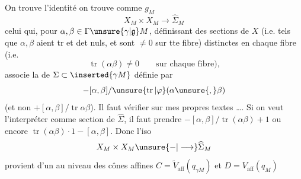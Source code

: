 On trouve l'identité  on trouve comme  $g_M$
\[
X_M\times X_M\longrightarrow\widehat{\Sigma}_M
\]
celui qui, pour $\alpha,\beta\in\Gamma\unsure{\gamma|\mathfrak g}M$, définissant des sections de $X$ (i.e. tels que $\alpha,\beta$ aient tr et det nuls, et sont $\ne0$ sur tte fibre) distinctes en chaque fibre (i.e.
\[
\operatorname{tr}(\alpha\beta)\ne0\qquad\text{sur chaque fibre),}
\]
associe la  de $\Sigma\subset\inserted{\gamma M}$ définie par
\[
-[\alpha,\beta]/\unsure{\operatorname{tr}|\varphi}(\alpha\unsure{,}\beta)
\]
(et non $+[\alpha,\beta]/\operatorname{tr}\alpha\beta$). Il faut vérifier sur mes propres textes  \ldots. Si on veut l'interpréter comme section de $\widehat\Sigma$, il faut prendre $-[\alpha,\beta]/\operatorname{tr}(\alpha\beta)+1$ ou encore $\operatorname{tr}(\alpha\beta)\cdot1-[\alpha,\beta]$. Donc l'iso 
\[
X_M\times X_M\unsure{-|\longrightarrow}\widehat{\Sigma}_M
\]
 provient d'un    au niveau des cônes  affines $C=\widetilde V_{\mathrm{aff}}(q_{\gamma M})$ et $D=V_{\mathrm{aff}}(q_M)$ 
